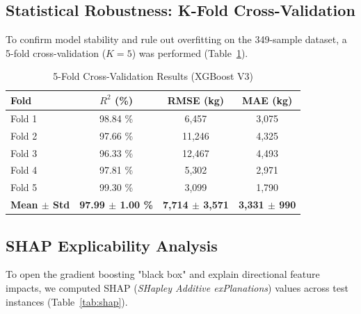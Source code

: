 \documentclass[lettersize,journal]{IEEEtran}
\begin{document}
\subsection{Statistical Robustness: K-Fold Cross-Validation}
To confirm model stability and rule out overfitting on the 349-sample dataset, a 5-fold cross-validation ($K=5$) was performed (Table~\ref{tab:kfold}).

\begin{table}[htbp]
\caption{5-Fold Cross-Validation Results (XGBoost V3)}
\label{tab:kfold}
\centering
\begin{tabular}{lccc}
\toprule
Fold & $R^2$ (\%) & RMSE (kg) & MAE (kg) \\
\midrule
Fold 1 & 98.84 \% & 6,457 & 3,075 \\
Fold 2 & 97.66 \% & 11,246 & 4,325 \\
Fold 3 & 96.33 \% & 12,467 & 4,493 \\
Fold 4 & 97.81 \% & 5,302 & 2,971 \\
Fold 5 & 99.30 \% & 3,099 & 1,790 \\
\midrule
\textbf{Mean $\pm$ Std} & \textbf{97.99 $\pm$ 1.00 \%} & \textbf{7,714 $\pm$ 3,571} & \textbf{3,331 $\pm$ 990} \\
\bottomrule
\end{tabular}
\end{table}

\subsection{SHAP Explicability Analysis}
To open the gradient boosting "black box" and explain directional feature impacts, we computed SHAP (\emph{SHapley Additive exPlanations}) values across test instances (Table~\ref{tab:shap}).
\end{document}

